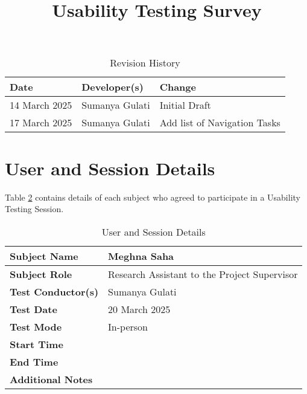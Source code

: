 \documentclass{article}
\title{Usability Testing Survey\\\progname}
\author{\authname}
\date{}
\begin{document}
\maketitle

\begin{table}[hp]
\caption{Revision History} \label{TblRevisionHistory}
\begin{tabularx}{\textwidth}{llX}
\toprule
\textbf{Date} & \textbf{Developer(s)} & \textbf{Change}\\
\midrule
14 March 2025 & Sumanya Gulati & Initial Draft\\
17 March 2025  & Sumanya Gulati & Add list of Navigation Tasks\\
\bottomrule
\end{tabularx}
\end{table}

\newpage

\section{User and Session Details}
Table \ref{UserDetails} contains details of each subject who agreed to participate in a 
Usability Testing Session.
\begin{table}[hp]
\begin{tabularx}{\textwidth}{l | X}
\toprule
\textbf{Subject Name} & Meghna Saha \\
\midrule
\textbf{Subject Role} & Research Assistant to the Project Supervisor \\
\midrule
\textbf{Test Conductor(s)} & Sumanya Gulati \\
\midrule
\textbf{Test Date} & 20 March 2025 \\
\midrule
\textbf{Test Mode} & In-person \\
\midrule
\textbf{Start Time} &  \\
\midrule
\textbf{End Time} &  \\
\midrule
\textbf{Additional Notes} &  \\
\bottomrule
\end{tabularx}
\caption{User and Session Details} \label{UserDetails}
\end{table}
\end{document}
